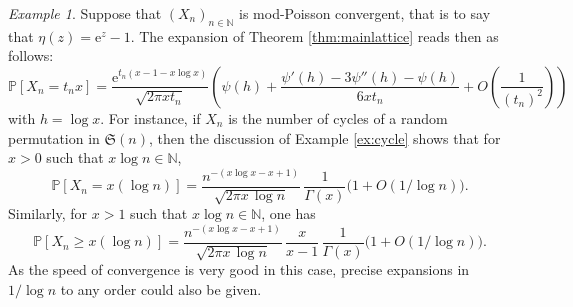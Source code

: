 \documentclass[12pt,a4paper,reqno]{amsart}
\theoremstyle{remark}
\newtheorem{example}[lemma]{Example}
\newtheorem{remark}[lemma]{Remark}
\newcommand{\N}{\mathbb{N}}
\newcommand{\E}{\mathrm{e}}
\newcommand{\I}{\mathrm{i}}
\newcommand{\esper}{\mathbb{E}}
\newcommand{\proba}{\mathbb{P}}
\begin{document}

\begin{example}\label{ex:randomcycle}
Suppose that $(X_{n})_{n \in \N}$ is mod-Poisson convergent, that is to say that $\eta(z)=\E^{z}-1$. The expansion of Theorem \ref{thm:mainlattice} reads then as follows:
$$\proba[X_{n}=t_{n}x]=\frac{\E^{t_{n} (x-1-x\log x)}}{\sqrt{2\pi x t_{n} }}\left(\psi(h)+\frac{\psi'(h)-3\psi''(h)-\psi(h)}{6xt_{n}}+O\!\left(\frac{1}{(t_{n})^{2}}\right)\right) $$
with $h = \log x$. For instance, if $X_{n}$ is the number of cycles of a random permutation in $\mathfrak{S}(n)$, then the discussion of Example \ref{ex:cycle} shows that for $x > 0$ such that $x\log n \in \N$, 
$$\proba[X_{n}= x(\log n)] = \frac{n^{-(x\log x-x+1)}}{\sqrt{2\pi x\,\log n}}\,\frac{1}{\Gamma(x)}\big(1+O(1/\log n)\big).$$
Similarly, for $x > 1$ such that $x\log n \in \N$, one has 
$$\proba[X_{n}\geq x(\log n)] = \frac{n^{-(x\log x-x+1)}}{\sqrt{2\pi x\,\log n}}\,\frac{x}{x-1}\,\frac{1}{\Gamma(x)}\big(1+O(1/\log n)\big).$$
As the speed of convergence is very good in this case, precise expansions in $1/\log n$ to any order could  also be given.
\end{example}
\bigskip
\end{document}
